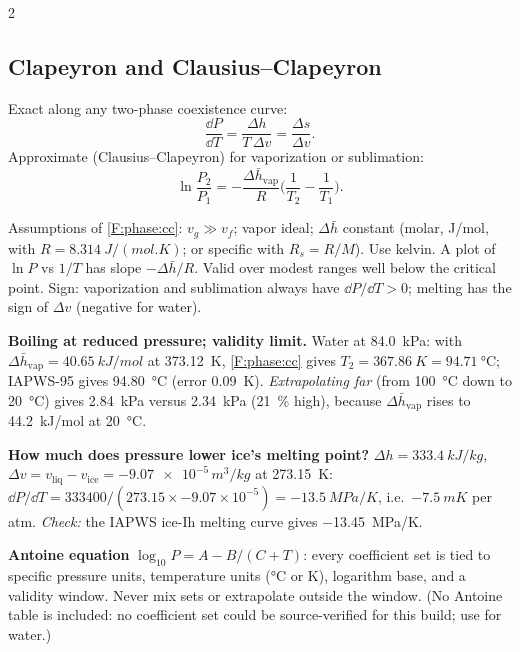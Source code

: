 \begin{multicols}{2}
\subsection{Clapeyron and Clausius--Clapeyron}\label{sec:clapeyron}
\CORE{}
\begin{formulabox}Exact along any two-phase coexistence curve:
\begin{equation}
\frac{\dd P}{\dd T}=\frac{\Delta h}{T\,\Delta v}=\frac{\Delta s}{\Delta v}. \label{F:phase:clapeyron}
\end{equation}
Approximate (Clausius--Clapeyron) for vaporization or sublimation:
\begin{equation}
\ln\frac{P_2}{P_1} = -\frac{\Delta \bar h_{\text{vap}}}{R}\Big(\frac{1}{T_2}-\frac{1}{T_1}\Big). \label{F:phase:cc}
\end{equation}
\end{formulabox}
Assumptions of \eqref{F:phase:cc}: $v_g\gg v_f$; vapor ideal; $\Delta\bar h$ constant (molar, \si{J/mol}, with $R=\SI{8.314}{J/(mol.K)}$; or specific with $R_s=R/M$). Use kelvin. A plot of $\ln P$ vs $1/T$ has slope $-\Delta\bar h/R$. Valid over modest ranges well below the critical point. Sign: vaporization and sublimation always have $\dd P/\dd T>0$; melting has the sign of $\Delta v$ (negative for water).

\begin{demobox}\textbf{Boiling at reduced pressure; validity limit.} Water at \SI{84.0}{kPa}: with $\Delta\bar h_{\text{vap}}=\SI{40.65}{kJ/mol}$ at \SI{373.12}{K}, \eqref{F:phase:cc} gives $T_2=\SI{367.86}{K}=\SI{94.71}{\celsius}$; IAPWS-95 gives \SI{94.80}{\celsius} (error \SI{0.09}{K}).
\emph{Extrapolating far} (from \SI{100}{\celsius} down to \SI{20}{\celsius}) gives \SI{2.84}{kPa} versus \SI{2.34}{kPa} (\SI{21}{\percent} high), because $\Delta\bar h_{\text{vap}}$ rises to \SI{44.2}{kJ/mol} at \SI{20}{\celsius}.\end{demobox}

\begin{demobox}\textbf{How much does pressure lower ice's melting point?} $\Delta h=\SI{333.4}{kJ/kg}$, $\Delta v=v_{\text{liq}}-v_{\text{ice}}=\num{-9.07e-5}\,\si{m^3/kg}$ at \SI{273.15}{K}: $\dd P/\dd T=333400/(273.15\times-9.07\times10^{-5})=\SI{-13.5}{MPa/K}$, i.e.\ $\SI{-7.5}{mK}$ per atm. \emph{Check:} the IAPWS ice-Ih melting curve gives \SI{-13.45}{MPa/K}.\end{demobox}

\textbf{Antoine equation} $\log_{10}P = A - B/(C+T)$: every coefficient set is tied to specific pressure units, temperature units ($\si{\celsius}$ or K), logarithm base, and a validity window. Never mix sets or extrapolate outside the window. (No Antoine table is included: no coefficient set could be source-verified for this build; use  for water.)


\end{multicols}
